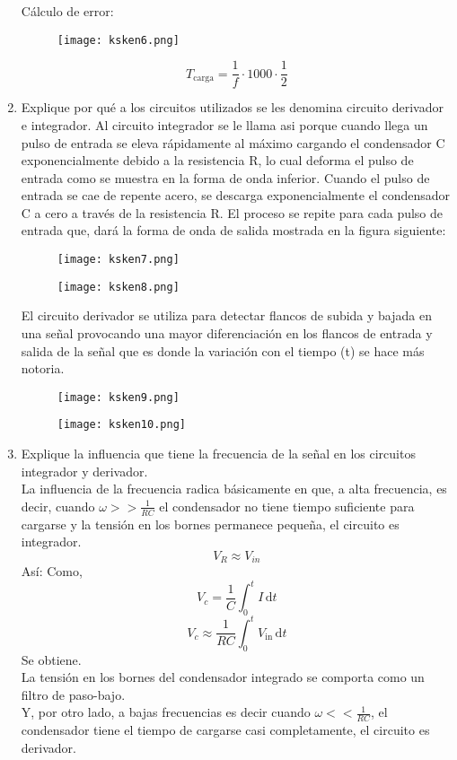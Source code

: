 \documentclass[a4paper,12pt]{report}
\begin{document}
\begin{enumerate}
Cálculo de error:
\begin{figure}[H]
\centering
\texttt{[image: ksken6.png]}
\end{figure}
$$
T_{\mathrm{carga}} = \frac{1}{f}\cdot 1000 \cdot \frac{1}{2}
$$
\item Explique por qué a los circuitos utilizados se les denomina circuito derivador e integrador.
Al circuito integrador se le llama asi porque cuando llega un pulso de entrada se eleva rápidamente al máximo cargando el condensador C exponencialmente debido a la resistencia R, lo cual deforma el pulso de entrada como se muestra en la forma de onda inferior. Cuando el pulso de entrada se cae de repente acero, se descarga exponencialmente el condensador C a cero a través de la resistencia R. El proceso se repite para cada pulso de entrada que, dará la forma de onda de salida mostrada en la figura siguiente:
\begin{figure}[H]
\centering
\texttt{[image: ksken7.png]}
\end{figure}
\begin{figure}[H]
\centering
\texttt{[image: ksken8.png]}
\end{figure}
El circuito derivador se utiliza para detectar flancos de subida y bajada en una señal provocando una mayor diferenciación en los flancos de entrada y salida de la señal que es donde la variación con el tiempo (t) se hace más notoria.
\begin{figure}[H]
\centering
\texttt{[image: ksken9.png]}
\end{figure}
\begin{figure}[H]
\centering
\texttt{[image: ksken10.png]}
\end{figure}
\item Explique la influencia que tiene la frecuencia de la señal en los circuitos integrador y derivador.\\
La influencia de la frecuencia radica básicamente en que, a alta frecuencia, es decir, cuando $\omega >> \frac{1}{RC}$ el condensador no tiene tiempo suficiente para cargarse y la tensión en los bornes permanece pequeña, el circuito es integrador.
$$
V_{R} \approx V_{in}
$$
Así:
Como,
$$
V_{c} = \frac{1}{C}\int_{0}^{t} I\,\mathrm{d}t 
$$
$$
V_{c} \approx \frac{1}{RC}\int_{0}^{t} V_{\mathrm{in}}\,\mathrm{d}t 
$$
Se obtiene.\\
La tensión en los bornes del condensador integrado se comporta como un filtro de paso-bajo.\\
Y, por otro lado, a bajas frecuencias es decir cuando $\omega < < \frac{1}{RC}$, el condensador tiene el tiempo de cargarse casi completamente, el circuito es derivador.\\

\end{enumerate}
\end{document}
